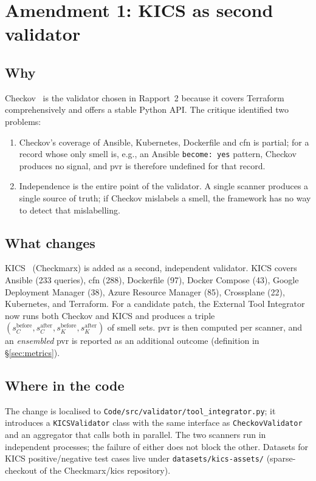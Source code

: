 \documentclass[12pt, a4paper]{report}
\begin{document}
\section{Amendment 1: KICS as second validator}
\label{sec:kics}

\subsection{Why}

Checkov~\citep{checkov2024} is the validator chosen in Rapport~2 because it
covers Terraform comprehensively and offers a stable Python API. The
critique identified two problems:

\begin{enumerate}
  \item Checkov's coverage of Ansible, Kubernetes, Dockerfile and
        \gls{cfn} is partial; for a record whose only smell is, e.g., an
        Ansible \texttt{become: yes} pattern, Checkov produces no signal,
        and \gls{pvr} is therefore undefined for that record.
  \item Independence is the entire point of the validator. A single
        scanner produces a single source of truth; if Checkov mislabels
        a smell, the framework has no way to detect that mislabelling.
\end{enumerate}

\subsection{What changes}

KICS~\citep{kics2024} (Checkmarx) is added as a second, independent
validator. KICS covers Ansible (233 queries), \gls{cfn} (288),
Dockerfile (97), Docker Compose (43), Google Deployment Manager (38),
Azure Resource Manager (85), Crossplane (22), Kubernetes, and Terraform.
For a candidate patch, the External Tool Integrator now runs both
Checkov and KICS and produces a triple
$(s_C^{\text{before}}, s_C^{\text{after}}, s_K^{\text{before}}, s_K^{\text{after}})$
of smell sets. \gls{pvr} is then computed per scanner, and an
\emph{ensembled} \gls{pvr} is reported as an additional outcome
(definition in \S\ref{sec:metrics}).

\subsection{Where in the code}

The change is localised to
\texttt{Code/src/validator/tool\_integrator.py}; it introduces a
\texttt{KICSValidator} class with the same interface as
\texttt{CheckovValidator} and an aggregator that calls both in parallel.
The two scanners run in independent processes; the failure of either does
not block the other. Datasets for KICS positive/negative test cases live
under \texttt{datasets/kics-assets/} (sparse-checkout of the
Checkmarx/kics repository).
\end{document}
